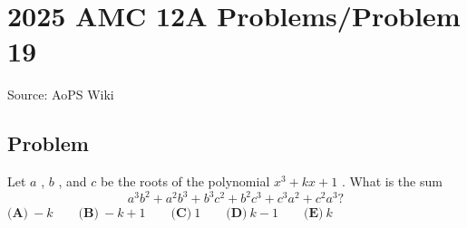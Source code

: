 \documentclass[12pt]{article}
\begin{document}
\section*{{2025 AMC 12A Problems/Problem 19}}
Source: AoPS Wiki

\subsection*{Problem}
Let $a$ , $b$ , and $c$ be the roots of the polynomial $x^3 + kx + 1$ . What is the sum \[a^3b^2 + a^2b^3 + b^3c^2 + b^2c^3 + c^3a^2 + c^2a^3?\] $\textbf{(A)}~-k\qquad\textbf{(B)}~-k+1\qquad\textbf{(C)}~1\qquad\textbf{(D)}~k-1\qquad\textbf{(E)}~k$
\end{document}
